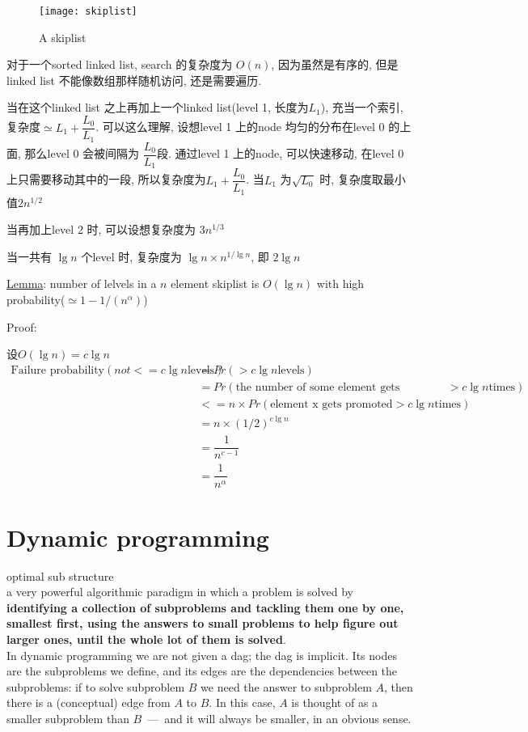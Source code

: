 \documentclass{article}
\begin{document}
\begin{figure}[htbp]
  \centering
  \texttt{[image: skiplist]}\\
  \caption{A skiplist}\label{fig.skiplist}
\end{figure}

对于一个sorted linked list, search 的复杂度为 $O(n)$, 因为虽然是有序的, 但是linked list 不能像数组那样随机访问, 还是需要遍历.

当在这个linked list 之上再加上一个linked list(level 1, 长度为$L_1$), 充当一个索引, 复杂度$\simeq L_1 + \dfrac{L_0}{L_1}$.
可以这么理解, 设想level 1 上的node 均匀的分布在level 0 的上面, 那么level 0 会被间隔为 $\dfrac{L_0}{L_1}$段.
通过level 1 上的node, 可以快速移动, 在level 0 上只需要移动其中的一段, 所以复杂度为$L_1 + \dfrac{L_0}{L_1}$.
当$L_1$ 为$\sqrt{L_0}$ 时, 复杂度取最小值$2 n^{1/2}$

当再加上level 2 时, 可以设想复杂度为 $3 n^{1/3}$

当一共有 $\lg n$ 个level 时, 复杂度为 $\lg n \times n^{1/\lg n}$, 即 $2 \lg n$

\noindent \underline{Lemma}:
number of lelvels in a $n$ element skiplist is $O(\lg n)$ with high probability($\simeq 1 - 1/(n^{\alpha})$)

Proof:

设$O(\lg n) = c \lg n$
$$
\begin{aligned}
\text{Failure probability}(not <= c \lg n \text{levels})
& = Pr(> c \lg n \text{levels}) \\
& = Pr(\text{the number of some element gets promoted} > c \lg n \text{times}) \\
& <= n \times Pr(\text{element x gets promoted} > c \lg n \text{times}) \\
& = n \times (1/2)^{c \lg n} \\
& = \dfrac{1}{n^{c - 1}} \\
& = \dfrac{1}{n^\alpha}
\end{aligned}
$$

\section{Dynamic programming}
optimal sub structure\\
a very powerful algorithmic paradigm in which a problem is solved by \textbf{identifying a collection of subproblems and tackling them one by one, smallest first, using the answers to small problems to help figure out larger ones, until the whole lot of them is solved}. \\
In dynamic programming we are not given a dag; the dag is implicit. Its nodes are the subproblems we define, and its edges are the dependencies between the subproblems: if to solve subproblem $B$ we need the answer to subproblem $A$, then there is a (conceptual) edge from $A$ to $B$. In this case, $A$ is thought of as a smaller subproblem than $B$\ ---\ and it will always be smaller, in an obvious sense.
\end{document}
